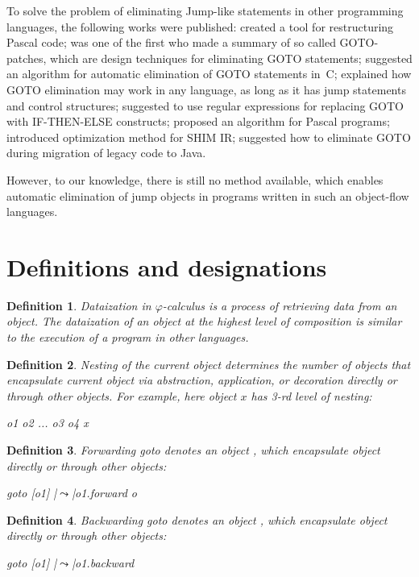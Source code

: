 \documentclass[sigplan,review,11pt,nonacm,natbib=false]{acmart}
\theoremstyle{theorems}
\newtheorem{eodefinition}{Definition}
\begin{document}
To solve the problem of eliminating Jump-like statements in other programming languages, the following works were published:
 created a tool for restructuring Pascal code;
 was one of the first who made a summary of so called GOTO-patches, which are design techniques for eliminating GOTO statements;
 suggested an algorithm for automatic elimination of GOTO statements in~C;
 explained how GOTO elimination may work in any language, as long as it has jump statements and control structures;
 suggested to use regular expressions for replacing GOTO with IF-THEN-ELSE constructs;
 proposed an algorithm for Pascal programs;
 introduced optimization method for SHIM IR;
 suggested how to eliminate GOTO during migration of legacy code to Java.

However, to our knowledge, there is still no method available, which enables automatic elimination of jump objects in programs written in such an object-flow languages.


\section{Definitions and designations}
\begin{eodefinition}
\emph{Dataization} in $\varphi$-calculus is a process of retrieving data from an object.
The dataization of an object at the highest level of composition is similar to the execution of a program in other languages.
\end{eodefinition}
\begin{eodefinition} \emph{Nesting} of the current object determines the number of objects that encapsulate current object via abstraction, application, or decoration directly or through other objects.
For example, here object $x$ has 3-rd level of nesting:
\begin{ffcode}
o1
  o2
  ...
  o3
    o4
      x
\end{ffcode}
\end{eodefinition}
\begin{eodefinition}
\emph{Forwarding goto} denotes an object , which encapsulate object  directly or through other objects:
\begin{ffcode}
goto
  [o1]
  |$\leadsto$|o1.forward o
\end{ffcode}
\end{eodefinition}
\begin{eodefinition}
\emph{Backwarding goto} denotes an object , which encapsulate object  directly or through other objects:
\begin{ffcode}
goto
  [o1]
  |$\leadsto$|o1.backward
\end{ffcode}
\end{eodefinition}
\end{document}
